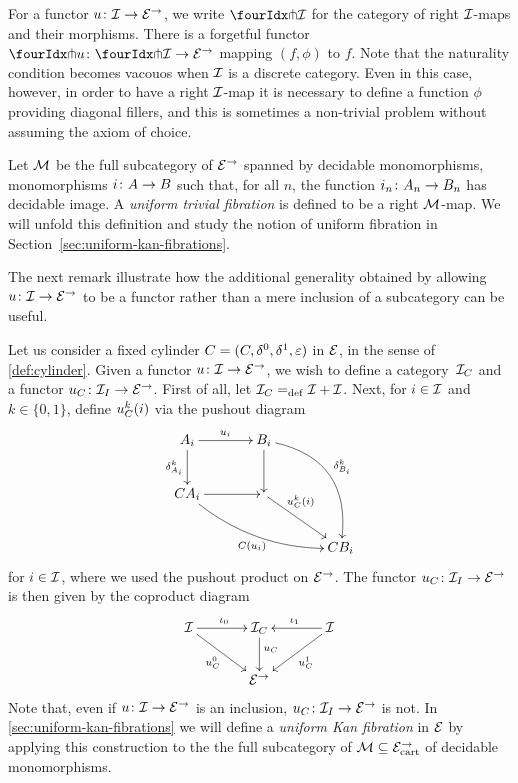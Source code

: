 \documentclass[reqno,10pt,a4paper,oneside]{amsart}
\begin{document}
For a functor $u \co \cal{I} \to \catE^\to$, we write $\liftr{\cal{I}}$ for the category  of 
right $\cal{I}$-maps and their morphisms. There is a forgetful functor~$\liftr{u} \co \liftr{\cal{I}} \to \catE^\to$
mapping $(f, \phi)$ to $f$. Note that the naturality condition becomes vacouos when $\cal{I}$ is a discrete category. Even in this case, however, in order to have a right $\cal{I}$-map it is necessary to define a function $\phi$ providing 
diagonal fillers, and this is sometimes a non-trivial problem without assuming the axiom of choice.



\begin{example}  \label{exa-triv-kan-fib}
Let $\cal{M}$ be the full subcategory of $\cal{E}^\to$ spanned by decidable mo\-no\-mor\-phisms, \ie
mo\-no\-mor\-phisms $i \co A \to B$ such that, for all $n$, the function $i_n \co A_n \to B_n$ has decidable
image. A \emph{uniform trivial fibration} is defined to be a right $\cal{M}$-map. We will unfold this
definition and study the notion of uniform  fibration in Section~\ref{sec:uniform-kan-fibrations}.
\end{example}


The next remark illustrate how the additional generality obtained by allowing $u \co \cal{I} \to \catE^\to$ to be a functor rather than a mere inclusion of a  subcategory can be useful.  


\begin{remark}  \label{rem:u-to-ucyl}
Let us consider a fixed cylinder $\cyl = (\cyl, \lcyl, \rcyl, \ccyl)$ in $\catE$, in the sense of \cref{def:cylinder}. 
Given a functor $u \co \cal{I} \to \catE^\to$, we wish to define a category~$\cal{I}_\cyl$ and a functor $u_\cyl \co \cal{I}_\interval \to \catE^\to$. First of all, let $\cal{I}_\cyl
\defeq \cal{I} + \cal{I}$.
 Next, for $i \in \cal{I}$ and $k \in \{ 0, 1 \}$, define $u_\cyl^k(i)$ via the pushout diagram
 \[
\xymatrix@C=1.2cm{
A_i \ar[r]^{u_i}  \ar[d]_{\kcyl_{A_i}} & B_i  \ar@/^2pc/[ddr]^{\kcyl_{B_i}} \ar[d] & \\ 
\cyl A_i \ar@/_1pc/[drr]_{\cyl (u_i)} \ar[r] &  \ar[dr]^-(.35){u_\cyl^k(i)}  & \\ 
 & & \cyl B_i} 
 \]
for $i \in \cal{I}$, where we used the pushout product on $\catE^\to$. The functor $u_\cyl \co \cal{I}_\interval \to \catE^\to$ is then given by the coproduct diagram
\begin{equation}
\label{equ:u-interval}
\vcenter{\hbox{\xymatrix@C=1.2cm{
\cal{I} \ar[r]^{\iota_0} \ar[dr]_-{u_\cyl^0} & \cal{I}_\cyl \ar[d]^(.4){u_\cyl} & \cal{I} \ar[dl]^-{u_\cyl^1} \ar[l]_{\iota_1} \\ 
 & \catE^\to }}}
\end{equation}
Note that, even if $u \co \cal{I} \to \catE^\to$ is an inclusion, $u_\cyl \co \cal{I}_\interval \to \catE^\to$ is not.
In \cref{sec:uniform-kan-fibrations} we will define a \emph{uniform Kan fibration} in $\cal{E}$ by applying
this construction to the the full subcategory of $\cal{M} \subseteq \cal{E}^\to_\cart$ of decidable monomorphisms.
\end{remark} 
\end{document}
